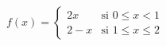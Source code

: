 \item $f(x) = \begin{cases} 2x & \text{si } 0 \le x < 1 \\ 2 - x & \text{si } 1 \le x \le 2 \end{cases}$
